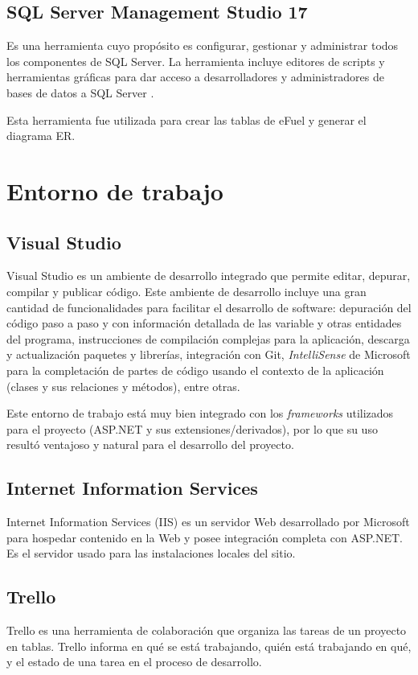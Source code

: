 \subsection{SQL Server Management Studio 17}
Es una herramienta cuyo propósito es configurar, gestionar y administrar todos los componentes de SQL Server. La herramienta incluye editores de scripts y herramientas gráficas para dar acceso a desarrolladores y administradores de bases de datos a SQL Server \cite{SSMSMicrosoft}.

Esta herramienta fue utilizada para crear las tablas de eFuel y generar el diagrama ER.

\section{Entorno de trabajo}
\subsection{Visual Studio}
Visual Studio es un ambiente de desarrollo integrado que permite editar, depurar, compilar y publicar código. \cite{visualStudioMicrosoft} Este ambiente de desarrollo incluye una gran cantidad de funcionalidades para facilitar el desarrollo de software: depuración del código paso a paso y con información detallada de las variable y otras entidades del programa, instrucciones de compilación complejas para la aplicación, descarga y actualización paquetes y librerías, integración con Git, \textit{IntelliSense} de Microsoft para la completación de partes de código usando el contexto de la aplicación (clases y sus relaciones y métodos), entre otras.

Este entorno de trabajo está muy bien integrado con los \textit{frameworks} utilizados para el proyecto (ASP.NET y sus extensiones/derivados), por lo que su uso resultó ventajoso y natural para el desarrollo del proyecto.

\subsection{Internet Information Services}
Internet Information Services (IIS) es un servidor Web desarrollado por Microsoft para hospedar contenido en la Web \cite{IISMicrosoft} y posee integración completa con ASP.NET. Es el servidor usado para las instalaciones locales del sitio.

\subsection{Trello}
Trello es una herramienta de colaboración que organiza las tareas de un proyecto en tablas. Trello informa en qué se está trabajando, quién está trabajando en qué, y el estado de una tarea en el proceso de desarrollo.

